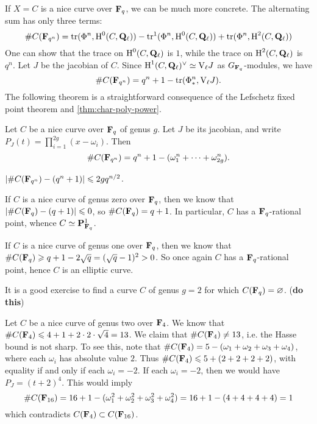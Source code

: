 If $X=C$ is a nice curve over $\mathbf{F}_q$, we can be much more concrete. The 
alternating sum has only three terms:
\[
  \# C(\mathbf{F}_{q^n}) = \operatorname{tr}(\Phi^n,\operatorname{H}^0(C,\mathbf{Q}_\ell)) - \operatorname{tr}^1(\Phi^n,\operatorname{H}^0(C,\mathbf{Q}_\ell)) + \operatorname{tr}(\Phi^n,\operatorname{H}^2(C,\mathbf{Q}_\ell))
\]
One can show that the trace on $\operatorname{H}^0(C,\mathbf{Q}_\ell)$ is $1$, while the trace on 
$\operatorname{H}^2(C,\mathbf{Q}_\ell)$ is $q^n$. Let $J$ be the jacobian of $C$. Since 
$\operatorname{H}^1(C,\mathbf{Q}_\ell)^\vee \simeq \mathrm{V}_\ell J$ as $G_{\mathbf{F}_q}$-modules, we have 
\[
  \# C(\mathbf{F}_{q^n}) = q^n+1 - \operatorname{tr}(\Phi_\ast^n, \mathrm{V}_\ell J) \text{.}
\]
The following theorem is a straightforward consequence of the Lefschetz fixed 
point theorem and \autoref{thm:char-poly-power}. 

\begin{theorem}\label{thm:weil-curve}
Let $C$ be a nice curve over $\mathbf{F}_q$ of genus $g$. Let $J$ be its jacobian, and 
write $P_J(t) = \prod_{i=1}^{2 g} (x-\omega_i)$. Then 
\[
  \# C(\mathbf{F}_{q^n}) = q^n+1 - (\omega_1^n + \cdots + \omega_{2 g}^n) \text{.}
\]
\end{theorem}

\begin{corollary}
$|\# C(\mathbf{F}_{q^n}) - (q^n+1)| \leqslant 2 g q^{n/2}$.
\end{corollary}






\begin{example}
If $C$ is a nice curve of genus zero over $\mathbf{F}_q$, then we know that 
$|\# C(\mathbf{F}_q) - (q+1)| \leqslant 0$, so $\# C(\mathbf{F}_q) = q+1$. In particular, 
$C$ has a $\mathbf{F}_q$-rational point, whence $C\simeq \mathbf{P}_{\mathbf{F}_q}^1$. 
\end{example}

\begin{example}
If $C$ is a nice curve of genus one over $\mathbf{F}_q$, then we know that 
$\# C(\mathbf{F}_q) \geqslant q+1-2\sqrt q = (\sqrt q-1)^2 > 0$. So once again $C$ has 
a $\mathbf{F}_q$-rational point, hence $C$ is an elliptic curve. 
\end{example}

It is a good exercise to find a curve $C$ of genus $g=2$ for which 
$C(\mathbf{F}_q)=\varnothing$. (\textbf{do this})

\begin{example}
Let $C$ be a nice curve of genus two over $\mathbf{F}_4$. We know that 
$\# C(\mathbf{F}_4) \leqslant 4+1+2\cdot 2\cdot \sqrt 4 = 13$. We claim that 
$\# C(\mathbf{F}_4) \ne 13$, i.e. the Hasse bound is not sharp. To see this, note 
that $\# C(\mathbf{F}_4) = 5 - (\omega_1+\omega_2+\omega_3+\omega_4)$, where each 
$\omega_i$ has absolute value $2$. Thus 
$\# C(\mathbf{F}_4) \leqslant 5 + (2+2+2+2)$, with equality if and only if each 
$\omega_i=-2$. If each $\omega_i=-2$, then we would have 
$P_J=(t+2)^4$. This would imply 
\[
  \# C(\mathbf{F}_{16}) = 16+1-(\omega_1^2+\omega_2^2+\omega_3^2+\omega_4^2) = 16+1-(4+4+4+4)=1
\]
which contradicts $C(\mathbf{F}_4)\subset C(\mathbf{F}_{16})$. 
\end{example}

